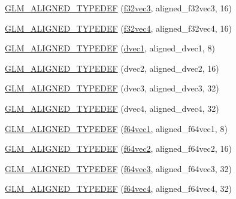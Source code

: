 \begin{DoxyCompactItemize}
\item 
\hyperlink{group__gtx__type__aligned_gade4458b27b039b9ca34f8ec049f3115a}{G\+L\+M\+\_\+\+A\+L\+I\+G\+N\+E\+D\+\_\+\+T\+Y\+P\+E\+D\+E\+F} (\hyperlink{group__gtc__type__precision_gab550330e62a7bc3fa9e6740b9421037c}{f32vec3}, aligned\+\_\+f32vec3, 16)
\item 
\hyperlink{group__gtx__type__aligned_ga2e8a12c5e6a9c4ae4ddaeda1d1cffe3b}{G\+L\+M\+\_\+\+A\+L\+I\+G\+N\+E\+D\+\_\+\+T\+Y\+P\+E\+D\+E\+F} (\hyperlink{group__gtc__type__precision_ga6848e3b5cb5c1f4c117717b309e726eb}{f32vec4}, aligned\+\_\+f32vec4, 16)
\item 
\hyperlink{group__gtx__type__aligned_ga3e0f35fa0c626285a8bad41707e7316c}{G\+L\+M\+\_\+\+A\+L\+I\+G\+N\+E\+D\+\_\+\+T\+Y\+P\+E\+D\+E\+F} (\hyperlink{namespaceglm_a8d5252eec287cf34cc18a219a118f9f2}{dvec1}, aligned\+\_\+dvec1, 8)
\item 
\hyperlink{group__gtx__type__aligned_ga78bfec2f185d1d365ea0a9ef1e3d45b8}{G\+L\+M\+\_\+\+A\+L\+I\+G\+N\+E\+D\+\_\+\+T\+Y\+P\+E\+D\+E\+F} (dvec2, aligned\+\_\+dvec2, 16)
\item 
\hyperlink{group__gtx__type__aligned_ga01fe6fee6db5df580b6724a7e681f069}{G\+L\+M\+\_\+\+A\+L\+I\+G\+N\+E\+D\+\_\+\+T\+Y\+P\+E\+D\+E\+F} (dvec3, aligned\+\_\+dvec3, 32)
\item 
\hyperlink{group__gtx__type__aligned_ga687d5b8f551d5af32425c0b2fba15e99}{G\+L\+M\+\_\+\+A\+L\+I\+G\+N\+E\+D\+\_\+\+T\+Y\+P\+E\+D\+E\+F} (dvec4, aligned\+\_\+dvec4, 32)
\item 
\hyperlink{group__gtx__type__aligned_ga8e842371d46842ff8f1813419ba49d0f}{G\+L\+M\+\_\+\+A\+L\+I\+G\+N\+E\+D\+\_\+\+T\+Y\+P\+E\+D\+E\+F} (\hyperlink{group__gtc__type__precision_ga4c945cd13adbebd25ea3df003efb92ef}{f64vec1}, aligned\+\_\+f64vec1, 8)
\item 
\hyperlink{group__gtx__type__aligned_ga32814aa0f19316b43134fc25f2aad2b9}{G\+L\+M\+\_\+\+A\+L\+I\+G\+N\+E\+D\+\_\+\+T\+Y\+P\+E\+D\+E\+F} (\hyperlink{group__gtc__type__precision_gacde4fe7b129521888cd30672c34650c5}{f64vec2}, aligned\+\_\+f64vec2, 16)
\item 
\hyperlink{group__gtx__type__aligned_gaf3d3bbc1e93909b689123b085e177a14}{G\+L\+M\+\_\+\+A\+L\+I\+G\+N\+E\+D\+\_\+\+T\+Y\+P\+E\+D\+E\+F} (\hyperlink{group__gtc__type__precision_gac531875c6544b7919f36a86cbe538736}{f64vec3}, aligned\+\_\+f64vec3, 32)
\item 
\hyperlink{group__gtx__type__aligned_ga804c654cead1139bd250f90f9bb01fad}{G\+L\+M\+\_\+\+A\+L\+I\+G\+N\+E\+D\+\_\+\+T\+Y\+P\+E\+D\+E\+F} (\hyperlink{group__gtc__type__precision_ga9d896f484039b22873e7bfb9e06f7b47}{f64vec4}, aligned\+\_\+f64vec4, 32)

\end{DoxyCompactItemize}
